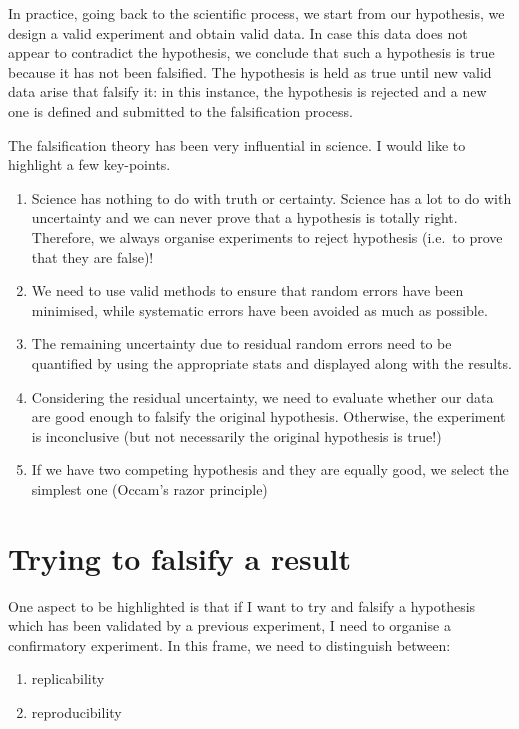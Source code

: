 \documentclass[a4paper,12pt,oneside]{book}
\providecommand{\tightlist}{%
  \setlength{\itemsep}{0pt}\setlength{\parskip}{0pt}}
\begin{document}
In practice, going back to the scientific process, we start from our hypothesis, we design a valid experiment and obtain valid data. In case this data does not appear to contradict the hypothesis, we conclude that such a hypothesis is true because it has not been falsified. The hypothesis is held as true until new valid data arise that falsify it: in this instance, the hypothesis is rejected and a new one is defined and submitted to the falsification process.

The falsification theory has been very influential in science. I would like to highlight a few key-points.

\begin{enumerate}
\def\labelenumi{\arabic{enumi}.}
\tightlist
\item
  Science has nothing to do with truth or certainty. Science has a lot to do with uncertainty and we can never prove that a hypothesis is totally right. Therefore, we always organise experiments to reject hypothesis (i.e.~to prove that they are false)!
\item
  We need to use valid methods to ensure that random errors have been minimised, while systematic errors have been avoided as much as possible.
\item
  The remaining uncertainty due to residual random errors need to be quantified by using the appropriate stats and displayed along with the results.
\item
  Considering the residual uncertainty, we need to evaluate whether our data are good enough to falsify the original hypothesis. Otherwise, the experiment is inconclusive (but not necessarily the original hypothesis is true!)
\item
  If we have two competing hypothesis and they are equally good, we select the simplest one (Occam's razor principle)
\end{enumerate}

\hypertarget{trying-to-falsify-a-result}{%
\section{Trying to falsify a result}\label{trying-to-falsify-a-result}}

One aspect to be highlighted is that if I want to try and falsify a hypothesis which has been validated by a previous experiment, I need to organise a confirmatory experiment. In this frame, we need to distinguish between:

\begin{enumerate}
\def\labelenumi{\arabic{enumi}.}
\tightlist
\item
  replicability
\item
  reproducibility
\end{enumerate}
\end{document}
